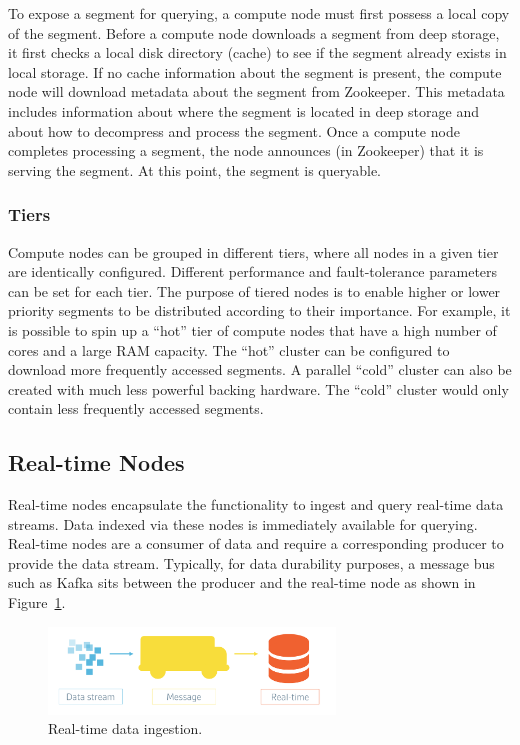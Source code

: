\documentclass{vldb}
\begin{document}
To expose a segment for querying, a compute node must first possess a
local copy of the segment. Before a compute node downloads a segment
from deep storage, it first checks a local disk directory (cache) to
see if the segment already exists in local storage. If no cache
information about the segment is present, the compute node will
download metadata about the segment from Zookeeper. This metadata
includes information about where the segment is located in deep
storage and about how to decompress and process the segment. Once a
compute node completes processing a segment, the node announces (in
Zookeeper) that it is serving the segment. At this point, the segment
is queryable.

\subsubsection{Tiers}
\label{sec:tiers}
Compute nodes can be grouped in different tiers, where all nodes in a
given tier are identically configured. Different performance and
fault-tolerance parameters can be set for each tier. The purpose of
tiered nodes is to enable higher or lower priority segments to be
distributed according to their importance. For example, it is possible
to spin up a “hot” tier of compute nodes that have a high number of
cores and a large RAM capacity. The “hot” cluster can be configured to
download more frequently accessed segments. A parallel “cold” cluster
can also be created with much less powerful backing hardware. The
“cold” cluster would only contain less frequently accessed segments.

\subsection{Real-time Nodes}
\label{sec:realtime}
Real-time nodes encapsulate the functionality to ingest and query
real-time data streams. Data indexed via these nodes is immediately
available for querying. Real-time nodes are a consumer of data and
require a corresponding producer to provide the data
stream. Typically, for data durability purposes, a message bus such as
Kafka \cite{kreps2011kafka} sits between the producer and the real-time node as shown
in Figure~\ref{fig:data-ingestion}.

\begin{figure}
\centering
\includegraphics[width = 3in]{druid_message_bus}
\caption{Real-time data ingestion.}
\label{fig:data-ingestion}
\end{figure}
\end{document}
